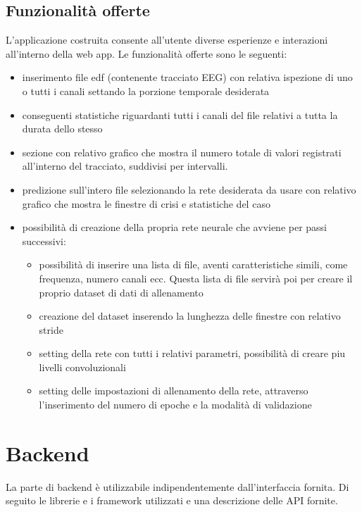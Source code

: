 \documentclass{article}
\begin{document}
\subsection{Funzionalità offerte}
L'applicazione costruita consente all'utente diverse esperienze e interazioni all'interno della web app. Le funzionalità offerte sono le seguenti:
\begin{itemize}
\item inserimento file edf (contenente tracciato EEG) con relativa ispezione di uno o tutti i canali settando la porzione temporale desiderata
\item conseguenti statistiche riguardanti tutti i canali del file relativi a tutta la durata dello stesso
\item sezione con relativo grafico che mostra il numero totale di valori registrati all'interno del tracciato, suddivisi per intervalli.
\item predizione sull'intero file selezionando la rete desiderata da usare con relativo grafico che mostra le finestre di crisi e statistiche del caso
\item possibilità di creazione della propria rete neurale che avviene per passi successivi:
\begin{itemize}
\item possibilità di inserire una lista di file, aventi caratteristiche simili, come frequenza, numero canali ecc. Questa lista di file servirà poi per creare il proprio dataset di dati di allenamento 
\item creazione del dataset inserendo la lunghezza delle finestre con relativo stride
\item setting della rete con tutti i relativi parametri, possibilità di creare piu livelli convoluzionali
\item setting delle impostazioni di allenamento della rete, attraverso l'inserimento del numero di epoche e la modalità di validazione
\end{itemize}
\end{itemize}


\section{Backend}
La parte di backend è utilizzabile indipendentemente dall'interfaccia fornita. Di seguito le librerie e i framework utilizzati e una descrizione delle API fornite. 
\end{document}

